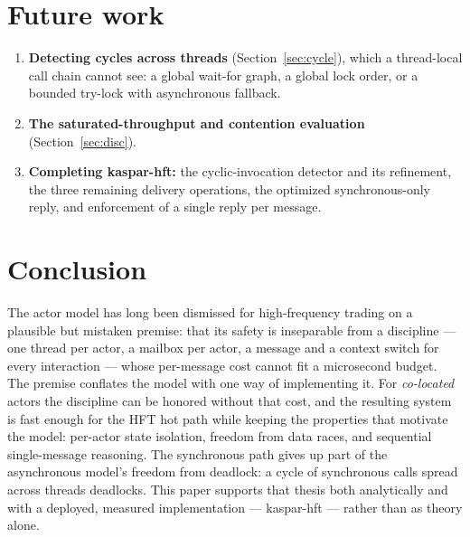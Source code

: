 \documentclass[11pt]{article}
\begin{document}
\section{Future work}
\label{sec:future}

\begin{enumerate}[leftmargin=1.6em]
  \item \textbf{Detecting cycles across threads} (Section~\ref{sec:cycle}),
  which a thread-local call chain cannot see: a global wait-for graph, a global
  lock order, or a bounded try-lock with asynchronous fallback.
  \item \textbf{The saturated-throughput and contention evaluation}
  (Section~\ref{sec:disc}).
  \item \textbf{Completing kaspar-hft:} the cyclic-invocation detector and its
  refinement, the three remaining delivery operations, the optimized
  synchronous-only reply, and enforcement of a single reply per message.
\end{enumerate}

\section{Conclusion}

The actor model has long been dismissed for high-frequency trading on a plausible
but mistaken premise: that its safety is inseparable from a discipline --- one
thread per actor, a mailbox per actor, a message and a context switch for every
interaction --- whose per-message cost cannot fit a microsecond budget. The
premise conflates the model with one way of implementing it. For \emph{co-located}
actors the discipline can be honored without that cost, and the resulting system
is fast enough for the HFT hot path while keeping the properties that motivate the
model: per-actor state isolation, freedom from data
races, and sequential single-message reasoning. The synchronous path gives up
part of the asynchronous model's freedom from deadlock: a cycle of synchronous
calls spread across threads deadlocks. This paper supports
that thesis both analytically and with a deployed, measured implementation ---
kaspar-hft --- rather than as theory alone.
\end{document}
